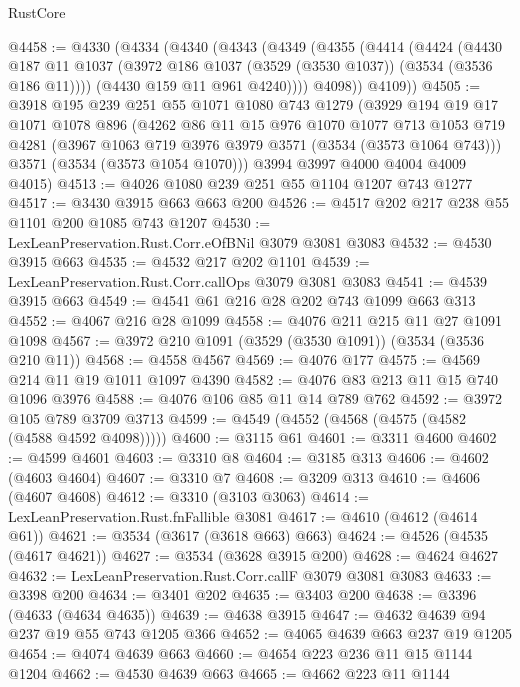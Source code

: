 \begin{lexlean}{RustCore}
\begin{coremodule}
@4458 := @4330
    (@4334
      (@4340
        (@4343
          (@4349
            (@4355
              (@4414
                (@4424
                  (@4430
                    @187
                    @11
                    @1037
                    (@3972 @186 @1037 (@3529 (@3530 @1037)) (@3534 (@3536 @186 @11))))
                  (@4430 @159 @11 @961 @4240))))
            @4098))
        @4109))
@4505 := @3918
    @195
    @239
    @251
    @55
    @1071
    @1080
    @743
    @1279
    (@3929
      @194
      @19
      @17
      @1071
      @1078
      @896
      (@4262
        @86
        @11
        @15
        @976
        @1070
        @1077
        @713
        @1053
        @719
        @4281
        (@3967 @1063 @719 @3976 @3979 @3571 (@3534 (@3573 @1064 @743)))
        @3571
        (@3534 (@3573 @1054 @1070)))
      @3994
      @3997
      @4000
      @4004
      @4009
      @4015)
@4513 := @4026 @1080 @239 @251 @55 @1104 @1207 @743 @1277
@4517 := @3430 @3915 @663 @663 @200
@4526 := @4517 @202 @217 @238 @55 @1101 @200 @1085 @743 @1207
@4530 := LexLeanPreservation.Rust.Corr.eOfBNil @3079 @3081 @3083
@4532 := @4530 @3915 @663
@4535 := @4532 @217 @202 @1101
@4539 := LexLeanPreservation.Rust.Corr.callOps @3079 @3081 @3083
@4541 := @4539 @3915 @663
@4549 := @4541 @61 @216 @28 @202 @743 @1099 @663 @313
@4552 := @4067 @216 @28 @1099
@4558 := @4076 @211 @215 @11 @27 @1091 @1098
@4567 := @3972 @210 @1091 (@3529 (@3530 @1091)) (@3534 (@3536 @210 @11))
@4568 := @4558 @4567
@4569 := @4076 @177
@4575 := @4569 @214 @11 @19 @1011 @1097 @4390
@4582 := @4076 @83 @213 @11 @15 @740 @1096 @3976
@4588 := @4076 @106 @85 @11 @14 @789 @762
@4592 := @3972 @105 @789 @3709 @3713
@4599 := @4549 (@4552 (@4568 (@4575 (@4582 (@4588 @4592 @4098)))))
@4600 := @3115 @61
@4601 := @3311 @4600
@4602 := @4599 @4601
@4603 := @3310 @8
@4604 := @3185 @313
@4606 := @4602 (@4603 @4604)
@4607 := @3310 @7
@4608 := @3209 @313
@4610 := @4606 (@4607 @4608)
@4612 := @3310 (@3103 @3063)
@4614 := LexLeanPreservation.Rust.fnFallible @3081
@4617 := @4610 (@4612 (@4614 @61))
@4621 := @3534 (@3617 (@3618 @663) @663)
@4624 := @4526 (@4535 (@4617 @4621))
@4627 := @3534 (@3628 @3915 @200)
@4628 := @4624 @4627
@4632 := LexLeanPreservation.Rust.Corr.callF @3079 @3081 @3083
@4633 := @3398 @200
@4634 := @3401 @202
@4635 := @3403 @200
@4638 := @3396 (@4633 (@4634 @4635))
@4639 := @4638 @3915
@4647 := @4632 @4639 @94 @237 @19 @55 @743 @1205 @366
@4652 := @4065 @4639 @663 @237 @19 @1205
@4654 := @4074 @4639 @663
@4660 := @4654 @223 @236 @11 @15 @1144 @1204
@4662 := @4530 @4639 @663
@4665 := @4662 @223 @11 @1144

\end{coremodule}
\end{lexlean}
